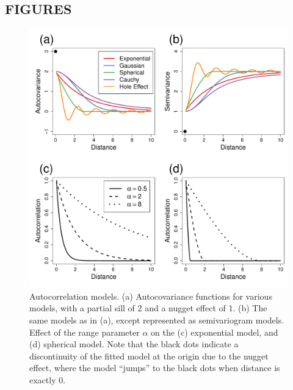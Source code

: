\documentclass[11pt, titlepage]{article}\usepackage[]{graphicx}\usepackage[]{color}
\begin{document}
\begin{spacing}{1.9}
\begin{flushleft}

\clearpage


\section*{FIGURES}


\begin{singlespace}

	\begin{figure}[H]
	  \begin{center}
	    \includegraphics[width=\linewidth]{figure/Fig-autocorrModels-1.pdf}
	  \end{center}
	  \caption{Autocorrelation models. (a) Autocovariance functions for various models, with a partial sill of 2 and a nugget effect of 1. (b) The same models as in (a), except represented as semivariogram models. Effect of the range parameter $\alpha$ on the (c) exponential model, and (d) spherical model. Note that the black dots indicate a discontinuity of the fitted model at the origin due to the nugget effect, where the model ``jumps'' to the black dots when distance is exactly 0. \label{fig:autocorrModels}}
  \end{figure}



\end{singlespace}
\end{flushleft}
\end{spacing}
\end{document}
